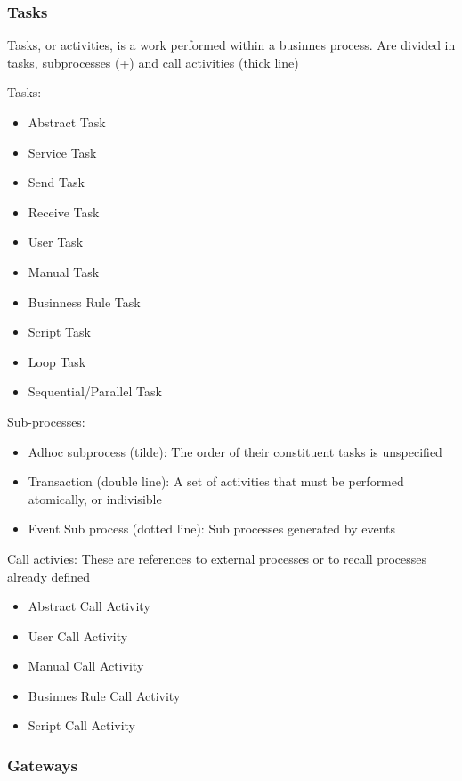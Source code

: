 \documentclass[12pt, a4paper]{article}
\begin{document}
\subsubsection{Tasks}
Tasks, or activities, is a work performed within a businnes process. Are divided in tasks, subprocesses (+)
and call activities (thick line)

Tasks:
\begin{itemize}
    \item Abstract Task 
    \item Service Task 
    \item Send Task 
    \item Receive Task 
    \item User Task 
    \item Manual Task 
    \item Businness Rule Task
    \item Script Task 
    \item Loop Task 
    \item Sequential/Parallel Task
\end{itemize}

Sub-processes:
\begin{itemize}
    \item Adhoc subprocess (tilde): The order of their constituent tasks is unspecified
    \item Transaction (double line): A set of activities that must be performed atomically, or indivisible
    \item Event Sub process (dotted line): Sub processes generated by events
\end{itemize}

Call activies:
These are references to external processes or to recall processes already defined

\begin{itemize}
    \item Abstract Call Activity
    \item User Call Activity
    \item Manual Call Activity
    \item Businnes Rule Call Activity
    \item Script Call Activity
\end{itemize}

\subsubsection{Gateways}
\end{document}
